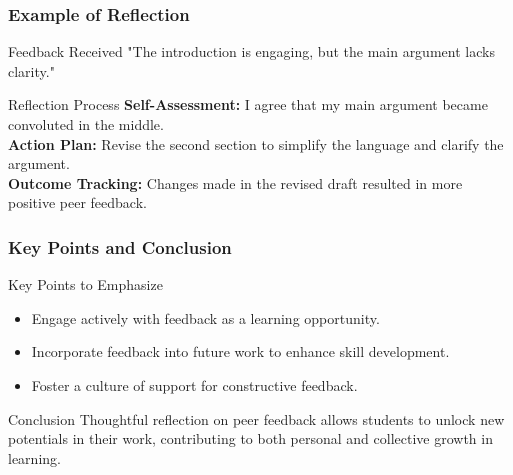 \documentclass[aspectratio=169]{beamer}
\begin{document}
\begin{frame}[fragile]
    \frametitle{Example of Reflection}
    \begin{block}{Feedback Received}
        "The introduction is engaging, but the main argument lacks clarity."
    \end{block}

    \begin{block}{Reflection Process}
        \textbf{Self-Assessment:} I agree that my main argument became convoluted in the middle.\\
        \textbf{Action Plan:} Revise the second section to simplify the language and clarify the argument.\\
        \textbf{Outcome Tracking:} Changes made in the revised draft resulted in more positive peer feedback.
    \end{block}
\end{frame}

\begin{frame}[fragile]
    \frametitle{Key Points and Conclusion}
    \begin{block}{Key Points to Emphasize}
        \begin{itemize}
            \item Engage actively with feedback as a learning opportunity.
            \item Incorporate feedback into future work to enhance skill development.
            \item Foster a culture of support for constructive feedback.
        \end{itemize}
    \end{block}
    
    \begin{block}{Conclusion}
        Thoughtful reflection on peer feedback allows students to unlock new potentials in their work, contributing to both personal and collective growth in learning.
    \end{block}
\end{frame}
\end{document}
